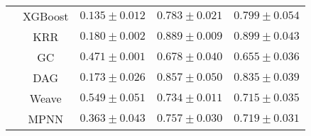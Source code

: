 \begin{table}[H]
\begin{tabular}{ |c|c|c|c|c| }
    & XGBoost & $0.135\pm0.012$ & $0.783\pm0.021$ & $0.799\pm0.054$ \\\cline{2-5}
    & KRR & $0.180\pm0.002$ & $0.889\pm0.009$ & $0.899\pm0.043$ \\\cline{2-5}
    & GC & $0.471\pm0.001$ & $\mathbf{0.678\pm0.040}$ & $\mathbf{0.655\pm0.036}$ \\\cline{2-5}
    & DAG & $0.173\pm0.026$ & $0.857\pm0.050$ & $0.835\pm0.039$ \\\cline{2-5}
    & Weave & $0.549\pm0.051$ & $0.734\pm0.011$ & $0.715\pm0.035$ \\\cline{2-5}
    & MPNN & $0.363\pm0.043$ & $0.757\pm0.030$ & $0.719\pm0.031$ \\\cline{2-5}
    \hline
    \end{tabular}
    \label{tab:ESOL_FreeSolv_Lipo}
\end{table}

